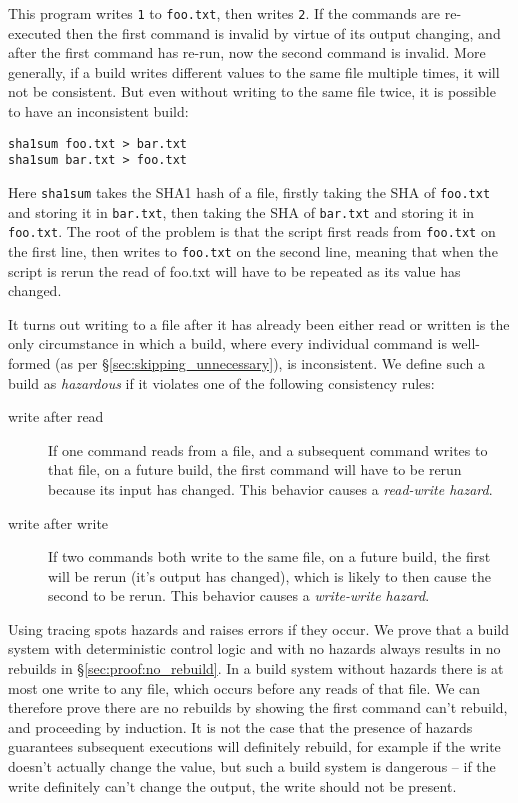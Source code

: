 This program writes \texttt{1} to \texttt{foo.txt}, then writes \texttt{2}. If the commands are re-executed then the first command is invalid by virtue of its output changing, and after the first command has re-run, now the second command is invalid. More generally, if a build writes different values to the same file multiple times, it will not be consistent. But even without writing to the same file twice, it is possible to have an inconsistent build:

\begin{verbatim}
sha1sum foo.txt > bar.txt
sha1sum bar.txt > foo.txt
\end{verbatim}

Here \texttt{sha1sum} takes the SHA1 hash of a file, firstly taking the SHA of \texttt{foo.txt} and storing it in \texttt{bar.txt}, then taking the SHA of \texttt{bar.txt} and storing it in \texttt{foo.txt}. The root of the problem is that the script first reads from \texttt{foo.txt} on the first line, then writes to \texttt{foo.txt} on the second line, meaning that when the script is rerun the read of foo.txt will have to be repeated as its value has changed.

It turns out writing to a file after it has already been either read or written is the only circumstance in which a build, where every individual command is well-formed (as per \S\ref{sec:skipping_unnecessary}), is inconsistent. We define such a build as \emph{hazardous} if it violates one of the following consistency rules:

\begin{description}
\item[write after read] If one command reads from a file, and a subsequent command writes to that file, on a future build, the first command will have to be rerun because its input has changed.  This behavior causes a \emph{read-write hazard}.
\item[write after write] If two commands both write to the same file, on a future build, the first will be rerun (it's output has changed), which is likely to then cause the second to be rerun.  This behavior causes a \emph{write-write hazard}.
\end{description}

Using tracing \Rattle spots hazards and raises errors if they occur. We prove that a build system with deterministic control logic and with no hazards always results in no rebuilds in \S\ref{sec:proof:no_rebuild}. In a build system without hazards there is at most one write to any file, which occurs before any reads of that file. We can therefore prove there are no rebuilds by showing the first command can't rebuild, and proceeding by induction. It is not the case that the presence of hazards guarantees subsequent executions will definitely rebuild, for example if the write doesn't actually change the value, but such a build system is dangerous -- if the write definitely can't change the output, the write should not be present.

